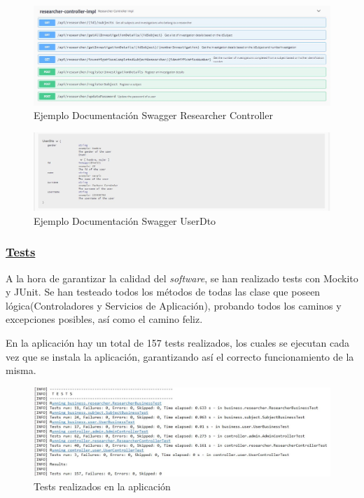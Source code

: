           \begin{figure}[h]
            \centering
            \includegraphics[width=1\textwidth]{images/swaggerendpoint.JPG}
            \caption{Ejemplo Documentación Swagger Researcher Controller}
        \end{figure}
        
        \begin{figure}[h]
            \centering
            \includegraphics[width=1\textwidth]{images/swaggeruserdto.JPG}
            \caption{Ejemplo Documentación Swagger UserDto}
        \end{figure}
        
        \FloatBarrier
        
        
        \subsubsection{\underline{Tests}}
        A la hora de garantizar la calidad del \textit{software}, se han realizado tests con Mockito y JUnit. Se han testeado todos los métodos de todas las clase que poseen lógica(Controladores y Servicios de Aplicación), probando todos los caminos y excepciones posibles, así como el camino feliz.
        \newline
        
        En la aplicación hay un total de 157 tests realizados, los cuales se ejecutan cada vez que se instala la aplicación, garantizando así el correcto funcionamiento de la misma.
        \newline
        
          \begin{figure}[h]
            \centering
            \includegraphics[width=1\textwidth]{images/numtests.JPG}
            \caption{Tests realizados en la aplicación}
        \end{figure}
        
